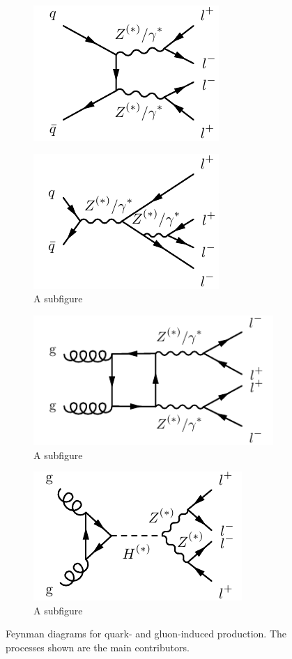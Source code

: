 \begin{figure}
\centering
\begin{subfigure}{.24\textwidth}
  \centering
  \includegraphics[width=.23\textwidth]{Figures/FeynGraphs/qqZZ4l.pdf}
  \caption{\qqZZ}
  \label{fig:m4lfeynman:qqZZ}
\end{subfigure}%
\begin{subfigure}{.24\textwidth}
  \centering
  \includegraphics[width=.23\textwidth]{Figures/FeynGraphs/qqZZ4lrad.pdf}
  \caption{A subfigure}
  \label{fig:m4lfeynman:singleZ}
\end{subfigure}
\begin{subfigure}{.24\textwidth}
  \centering
  \includegraphics[width=.23\textwidth]{Figures/FeynGraphs/ggZZ4lbox.pdf}
  \caption{A subfigure}
  \label{fig:m4lfeynman:ggZZ}
\end{subfigure}
\begin{subfigure}{.24\textwidth}
  \centering
  \includegraphics[width=.23\textwidth]{Figures/FeynGraphs/ggZZ4lhiggs.pdf}
  \caption{A subfigure}
  \label{fig:m4lfeynman:ggHZZ}
\end{subfigure}
\caption{Feynman diagrams for quark- and gluon-induced \ZZ production. The processes shown are the main contributors.}
\label{fig:m4lfeynman}
\end{figure}

